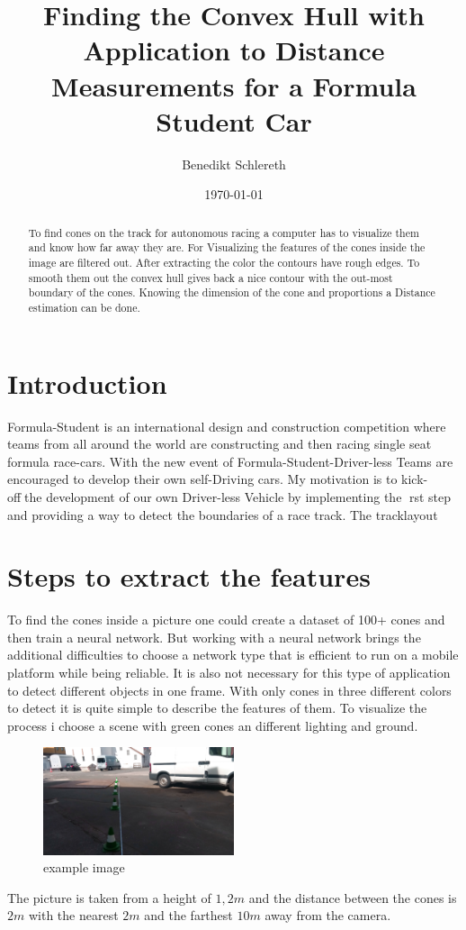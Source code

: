 \documentclass[10pt,a4paper]{article}
\title{Finding the Convex Hull with Application to Distance Measurements for a Formula Student Car}
\author{Benedikt Schlereth}
\date{\today}
\begin{document}
	\maketitle
	\tableofcontents
	\pagebreak
	
	\begin{abstract}
	To find cones on the track for autonomous racing a computer has to visualize them and know how far away they are.
	For Visualizing the features of the cones inside the image are filtered out. After extracting the color the contours have rough edges. To smooth them out the convex hull gives back a nice contour with the out-most boundary of the cones. Knowing the dimension of the cone and proportions a Distance estimation can be done.
	\end{abstract}
	
	\section{Introduction}
	Formula-Student is an international design and construction competition where teams from all around the world are constructing and then racing single seat formula race-cars. With	the new event of Formula-Student-Driver-less Teams are encouraged to develop their own self-Driving cars. My motivation is to kick-offthe development of our own Driver-less Vehicle by implementing the rst step and providing a way to detect the boundaries of a race track. The tracklayout 
	
	\section{Steps to extract the features}
	To find the cones inside a picture one could create a dataset of 100+ cones and then train a neural network. But working with a neural network brings the additional difficulties to choose a network type that is efficient to run on a mobile platform while being reliable.
	It is also not necessary for this type of application to detect different objects in one frame.
	With only cones in three different colors to detect it is quite simple to describe the features of them.
	To visualize the process i choose a scene with green cones an different lighting and ground.
	\begin{figure}[h]
		\centering
		\includegraphics[width=0.5\textwidth]{Abb/start.png}
		\caption{example image}
		\label{example image}
	\end{figure}
	The picture is taken from a height of $1,2 m$ and the distance between the cones is $2m$ with the nearest $2m$ and the farthest $10m$ away from the camera.
	 
\end{document}
